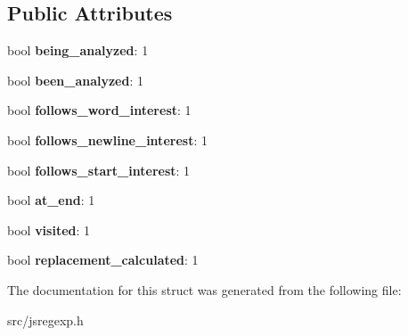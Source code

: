 \subsection*{Public Attributes}
\begin{DoxyCompactItemize}
\item 
\hypertarget{structv8_1_1internal_1_1_node_info_ae29732b0dc44899a91c2df9c687f5664}{}bool {\bfseries being\+\_\+analyzed}\+: 1\label{structv8_1_1internal_1_1_node_info_ae29732b0dc44899a91c2df9c687f5664}

\item 
\hypertarget{structv8_1_1internal_1_1_node_info_a03902eddc2713d75fc3ac3a82544d736}{}bool {\bfseries been\+\_\+analyzed}\+: 1\label{structv8_1_1internal_1_1_node_info_a03902eddc2713d75fc3ac3a82544d736}

\item 
\hypertarget{structv8_1_1internal_1_1_node_info_af63a381671cda76b6608338e7e020dc5}{}bool {\bfseries follows\+\_\+word\+\_\+interest}\+: 1\label{structv8_1_1internal_1_1_node_info_af63a381671cda76b6608338e7e020dc5}

\item 
\hypertarget{structv8_1_1internal_1_1_node_info_aef257fa538416d9d0c8d96fc30b3f3f7}{}bool {\bfseries follows\+\_\+newline\+\_\+interest}\+: 1\label{structv8_1_1internal_1_1_node_info_aef257fa538416d9d0c8d96fc30b3f3f7}

\item 
\hypertarget{structv8_1_1internal_1_1_node_info_a5deecfa3f3fb5e25fa9502e9b0dbb341}{}bool {\bfseries follows\+\_\+start\+\_\+interest}\+: 1\label{structv8_1_1internal_1_1_node_info_a5deecfa3f3fb5e25fa9502e9b0dbb341}

\item 
\hypertarget{structv8_1_1internal_1_1_node_info_ad16dae437fa8287e274caf3854f220fd}{}bool {\bfseries at\+\_\+end}\+: 1\label{structv8_1_1internal_1_1_node_info_ad16dae437fa8287e274caf3854f220fd}

\item 
\hypertarget{structv8_1_1internal_1_1_node_info_aab006e951efad67bfeeface9eec4094b}{}bool {\bfseries visited}\+: 1\label{structv8_1_1internal_1_1_node_info_aab006e951efad67bfeeface9eec4094b}

\item 
\hypertarget{structv8_1_1internal_1_1_node_info_af061bd754b39188f421fe14c3d986d88}{}bool {\bfseries replacement\+\_\+calculated}\+: 1\label{structv8_1_1internal_1_1_node_info_af061bd754b39188f421fe14c3d986d88}

\end{DoxyCompactItemize}


The documentation for this struct was generated from the following file\+:\begin{DoxyCompactItemize}
\item 
src/jsregexp.\+h\end{DoxyCompactItemize}

